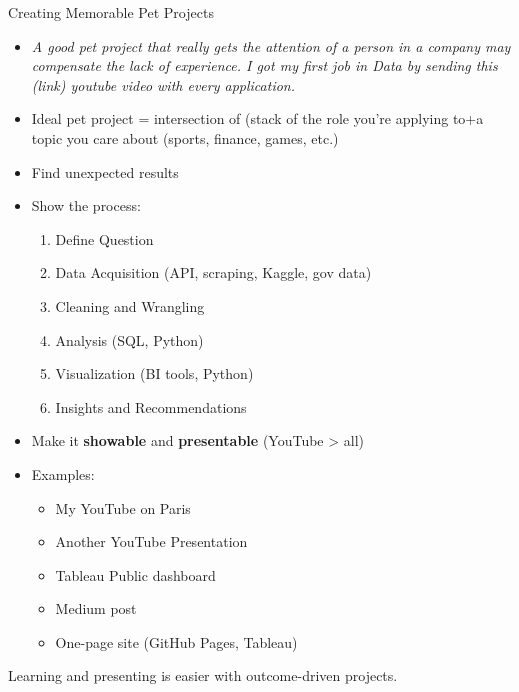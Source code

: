 \documentclass[10pt,a4paper]{article}
\begin{document}
\begin{multicols}{3}
\begin{textboxRed}{Creating Memorable Pet Projects}

\begin{itemize}
    \item  \emph{A good pet project that really gets the attention of a person in a company may compensate the lack of experience. I got my first job in Data by sending this (link) youtube video with every application.}
    \item Ideal pet project = intersection of (stack of the role you're applying to+a topic you care about (sports, finance, games, etc.)
    \item Find unexpected results
    \item Show the process:
    \begin{enumerate}
        \item Define Question
        \item Data Acquisition (API, scraping, Kaggle, gov data)
        \item Cleaning and Wrangling
        \item Analysis (SQL, Python)
        \item Visualization (BI tools, Python)
        \item Insights and Recommendations
    \end{enumerate}
    \item Make it \textbf{showable} and \textbf{presentable} (YouTube > all)
    \item Examples:
    \begin{itemize}
        \item My YouTube on Paris
        \item Another YouTube Presentation
        \item Tableau Public dashboard
        \item Medium post
        \item One-page site (GitHub Pages, Tableau)
    \end{itemize}
\end{itemize}
Learning and presenting is easier with outcome-driven projects.
\end{textboxRed}


\end{multicols}
\end{document}
